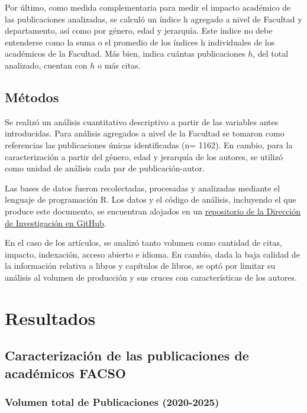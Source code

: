 \documentclass[
  spanish,
  a4paper,
  oneside]{scrbook}
\begin{document}
Por último, como medida complementaria para medir el impacto académico
de las publicaciones analizadas, se calculó un índice h agregado a nivel
de Facultad y departamento, así como por género, edad y jerarquía. Este
índice no debe entenderse como la suma o el promedio de los índices h
individuales de los académicos de la Facultad. Más bien, indica cuántas
publicaciones \(h\), del total analizado, cuentan con \(h\) o más citas.

\section{Métodos}\label{muxe9todos}

Se realizó un análisis cuantitativo descriptivo a partir de las
variables antes introducidas. Para análisis agregados a nivel de la
Facultad se tomaron como referencias las publicaciones únicas
identificadas (n= 1162). En cambio, para la caracterización a partir del
género, edad y jerarquía de los autores, se utilizó como unidad de
análisis cada par de publicación-autor.

Las bases de datos fueron recolectadas, procesadas y analizadas mediante
el lenguaje de programación R. Los datos y el código de análisis,
incluyendo el que produce este documento, se encuentran alojados en un
\href{https://github.com/facso-investigacion/publicaciones-facso}{repositorio
de la Dirección de Investigación en GitHub}.

En el caso de los artículos, se analizó tanto volumen como cantidad de
citas, impacto, indexación, acceso abierto e idioma. En cambio, dada la
baja calidad de la información relativa a libros y capítulos de libros,
se optó por limitar su análisis al volumen de producción y sus cruces
con características de los autores.


\chapter{Resultados}\label{sec-results}

\section{Caracterización de las publicaciones de académicos
FACSO}\label{caracterizaciuxf3n-de-las-publicaciones-de-acaduxe9micos-facso}

\subsection{Volumen total de Publicaciones
(2020-2025)}\label{volumen-total-de-publicaciones-2020-2025}
\end{document}
